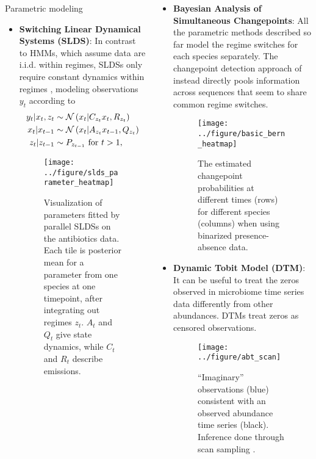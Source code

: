 \documentclass[final, 8pt]{beamer}
\newlength{\onecolwid}
\begin{document}
\begin{frame}
\begin{columns}
\begin{column}{\onecolwid}
\begin{block}{Parametric modeling}
\begin{itemize}
\item \textbf{Switching Linear Dynamical Systems (SLDS)}: In contrast to HMMs,
  which assume data are i.i.d. within regimes, SLDSs only require constant
  dynamics within regimes \citep{linderman2016recurrent}, modeling observations
  $y_t$ according to
\begin{align*}
  y_{t} \vert x_{t}, z_{t} &\sim \mathcal{N}\left(x_{t} \vert C_{z_t}x_{t}, R_{z_t}\right) \\
  x_{t} \vert x_{t - 1} &\sim \mathcal{N}\left(x_{t} \vert A_{z_{t}}x_{t - 1}, Q_{z_t}\right) \\
  z_{t} \vert z_{t - 1} &\sim P_{z_{t - 1}} \text{ for } t > 1,
\end{align*}
\begin{figure}[ht]
  \centering
  \texttt{[image: ../figure/slds\_parameter\_heatmap]}
  \caption{Visualization of parameters fitted by parallel SLDSs on the
    antibiotics data. Each tile is posterior mean for a parameter from one
    species at one timepoint, after integrating out regimes $z_t$. $A_t$ and
    $Q_t$ give state dynamics, while $C_t$ and $R_t$ describe emissions.
    \label{fig:slds_pca_scores} }
\end{figure}
\end{itemize}
\end{block}

\end{column}
\begin{column}{\onecolwid}
\begin{block}{}
\begin{itemize}
\item \textbf{Bayesian Analysis of Simultaneous Changepoints}: All the
  parametric methods described so far model the regime switches for each species
  separately. The changepoint detection approach of \citep{fan2015empirical}
  instead directly pools information across sequences that seem to share common
  regime switches.
\begin{figure}[ht]
  \centering
  \texttt{[image: ../figure/basic\_bern\_heatmap]}
  \caption{The estimated changepoint probabilities at different times (rows) for
    different species (columns) when using binarized presence-absence data.
    \label{fig:basic_bern_heamtap} }
\end{figure}
\item \textbf{Dynamic Tobit Model (DTM)}: It can be useful to treat the zeros
  observed in microbiome time series data differently from other abundances.
  DTMs treat zeros as censored observations.
\begin{figure}[!p]
  \centering
  \texttt{[image: ../figure/abt\_scan]}
  \caption{``Imaginary'' observations (blue) consistent with an observed
    abundance time series (black). Inference done through scan sampling
    \citep{de1997scan}. \label{fig:abt_scan}}
\end{figure}
\end{itemize}
\end{block}


\end{column}
\end{columns}
\end{frame}
\end{document}
